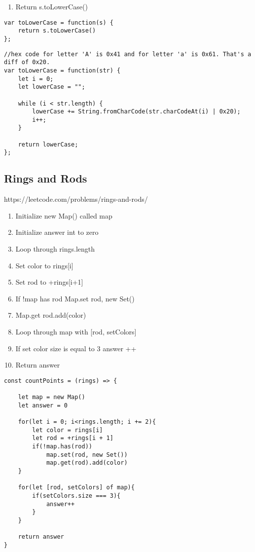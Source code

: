 \documentclass[10pt]{article}
\begin{document}
\begin{enumerate}
	\item Return s.toLowerCase()
\end{enumerate}

\begin{lstlisting}[title=Solution toLowerCase, captionpos=t]
var toLowerCase = function(s) {
    return s.toLowerCase()
};
\end{lstlisting}

\begin{lstlisting}[title=Solution toLowerCase with hex code, captionpos=t]
//hex code for letter 'A' is 0x41 and for letter 'a' is 0x61. That's a diff of 0x20.
var toLowerCase = function(str) {
    let i = 0;
    let lowerCase = "";
    
    while (i < str.length) {
        lowerCase += String.fromCharCode(str.charCodeAt(i) | 0x20);
        i++;
    }
    
    return lowerCase;
};
\end{lstlisting}
\medskip %


\pagebreak %
\medskip 
\subsection{Rings and Rods}
https://leetcode.com/problems/rings-and-rods/

\begin{enumerate}
	\item Initialize new Map() called map
	\item Initialize answer int to zero 
	\item Loop through rings.length 
	\item Set color to rings[i]
	\item Set rod to +rings[i+1]
	\item If !map has rod Map.set rod, new Set()
	\item Map.get rod.add(color)
	\item Loop through map with [rod, setColors]
	\item If set color size is equal to 3 answer ++
	\item Return answer
\end{enumerate}

\begin{lstlisting}[title=Solution countPoints, captionpos=t]
const countPoints = (rings) => {
    
    let map = new Map()
    let answer = 0
    
    for(let i = 0; i<rings.length; i += 2){
        let color = rings[i]
        let rod = +rings[i + 1]
        if(!map.has(rod))
            map.set(rod, new Set())
            map.get(rod).add(color)
    }
    
    for(let [rod, setColors] of map){
        if(setColors.size === 3){
            answer++
        }
    }
    
    return answer
}
\end{lstlisting}
\end{document}
